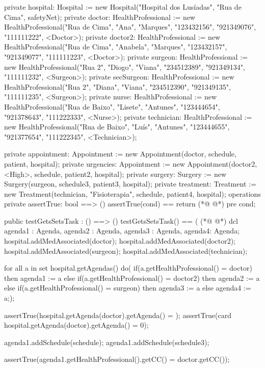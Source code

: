 \begin{vdmpp}[breaklines=true]
  private hospital: Hospital := new Hospital("Hospital dos Lusíadas", "Rua de Cima", safetyNet);
  private doctor: HealthProfessional := new HealthProfessional("Rua de Cima", "Ana", "Marques", "123432156", "921349076", "111111222", <Doctor>);
  private doctor2: HealthProfessional := new HealthProfessional("Rua de Cima", "Anabela", "Marques", "123432157", "921349077", "111111223", <Doctor>);
  private surgeon: HealthProfessional := new HealthProfessional("Rua 2", "Diogo", "Viana", "234512389", "921349134", "111111232", <Surgeon>);
  private secSurgeon: HealthProfessional := new HealthProfessional("Rua 2", "Diana", "Viana", "234512390", "921349135", "111111235", <Surgeon>);
 private nurse: HealthProfessional := new HealthProfessional("Rua de Baixo", "Lisete", "Antunes", "123444654", "921378643", "111222333", <Nurse>);
 private technician: HealthProfessional := new HealthProfessional("Rua de Baixo", "Luís", "Antunes", "123444655", "921377654", "111222345", <Technician>);
 
 private appointment: Appointment := new Appointment(doctor, schedule, patient, hospital);
 private urgencies: Appointment := new Appointment(doctor2, <High>, schedule, patient2, hospital);
 private surgery: Surgery := new Surgery(surgeon, schedule3, patient3, hospital);
 private treatment: Treatment := new Treatment(technician, "Fisioterapia", schedule, patient4, hospital);
operations
 private assertTrue: bool ==> ()
  assertTrue(cond) == return
(*@
\label{assertTrue:59}
@*)
 pre cond;
 
 public testGetsSetsTask : () ==> ()
  testGetsSetsTask() == (
(*@
\label{testGetsSetsTask:63}
@*)
   dcl agenda1 : Agenda, agenda2 : Agenda, agenda3 : Agenda, agenda4: Agenda;
   hospital.addMedAssociated(doctor);
   hospital.addMedAssociated(doctor2);
   hospital.addMedAssociated(surgeon);
   hospital.addMedAssociated(technician);
   
   for all a in set hospital.getAgendas() do(
    if(a.getHealthProfessional() = doctor)
     then agenda1 := a
    else if(a.getHealthProfessional() = doctor2)
     then agenda2 := a
    else if(a.getHealthProfessional() = surgeon)
     then agenda3 := a
    else
     agenda4 := a;);
   
   assertTrue(hospital.getAgenda(doctor).getAgenda() = {});
   assertTrue(card hospital.getAgenda(doctor).getAgenda() = 0);
   
   agenda1.addSchedule(schedule);
   agenda1.addSchedule(schedule3);
   
   assertTrue(agenda1.getHealthProfessional().getCC() = doctor.getCC());
   

\end{vdmpp}
